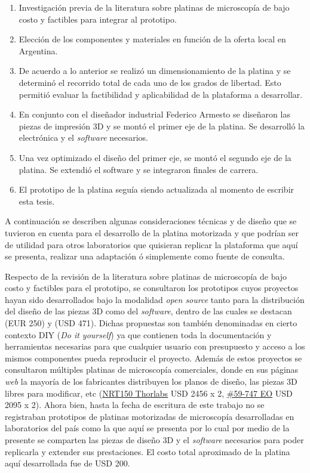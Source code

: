 \begin{enumerate}
\item Investigación previa de la literatura sobre platinas de microscopía de bajo costo y factibles para integrar al prototipo.
\item Elección de los componentes y materiales en función de la oferta local en Argentina.
\item De acuerdo a lo anterior se realizó un dimensionamiento de la platina y se determinó el recorrido total de cada uno de los grados de libertad. Esto permitió evaluar la factibilidad y aplicabilidad de la plataforma a desarrollar.
\item En conjunto con el diseñador industrial Federico Armesto se diseñaron las piezas de impresión 3D y se montó el primer eje de la platina. Se desarrolló la electrónica y el \textit{software} necesarios.
\item Una vez optimizado el diseño del primer eje, se montó el segundo eje de la platina. Se extendió el software y se integraron finales de carrera.
\item El prototipo de la platina seguía siendo actualizada al momento de escribir esta tesis.
\end{enumerate}

A continuación se describen algunas consideraciones técnicas y de diseño que se tuvieron en cuenta para el desarrollo de la platina motorizada y que podrían ser de utilidad para otros laboratorios que quisieran replicar la plataforma que aquí se presenta, realizar una adaptación ó simplemente como fuente de consulta.

Respecto de la revisión de la literatura sobre platinas de microscopía de bajo costo y factibles para el prototipo, se consultaron  los prototipos cuyos proyectos hayan sido desarrollados bajo la modalidad \textit{open source} tanto para la distribución del diseño de las piezas 3D como del \textit{software}, dentro de las cuales se destacan \cite{schaa}(EUR 250) y \cite{campbells}(USD 471). Dichas propuestas son también denominadas en cierto contexto DIY (\textit{Do it yourself}) ya que contienen toda la documentación y herramientas necesarias para que cualquier usuario con presupuesto y acceso a los mismos componentes pueda reproducir el proyecto. Además de estos proyectos se consultaron múltiples platinas de microscopía comerciales, donde en sus páginas \textit{web} la mayoría de los fabricantes distribuyen los planos de diseño, las piezas 3D libres para modificar, etc (\href{https://www.thorlabs.com/newgrouppage9.cfm?objectgroup\_id=2132}{NRT150 Thorlabs} USD 2456 x 2, \href{https://www.edmundoptics.com/p/150mm-motorized-stage/16419/}{\#59-747 EO} USD 2095 x 2). Ahora bien, hasta la fecha de escritura de este trabajo no se registraban prototipos de platinas motorizadas de microscopía desarrolladas en laboratorios del país como la que aquí se presenta por lo cual por medio de la presente se comparten las piezas de diseño 3D y el \textit{software} necesarios para poder replicarla y extender sus prestaciones. El costo total aproximado de la platina aquí desarrollada fue de USD 200.




